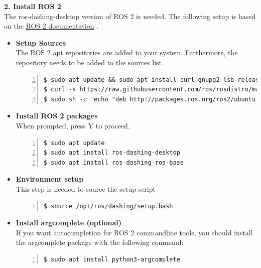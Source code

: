 \documentclass[plainarticle,zihtitle,english,final,hyperref,utf8]{zihpub}
\begin{document}
\textbf{2. Install ROS 2}\\
\newline
The ros-dashing-desktop version of ROS 2 is needed. The following setup is based on the \href{https://index.ros.org/doc/ros2/Installation/Dashing/Linux-Install-Debians/}{ROS 2 documentation} \cite{ros2docuros}.
\begin{itemize}
    \item \textbf{Setup Sources} \\
    The ROS 2 apt repositories are added to your system. Furthermore, the repository needs to be added to the sources list.
    \begin{Verbatim}[breaklines=true, breakanywhere=true, baselinestretch=1,fontsize=\scriptsize,numbers=left,frame=single,stepnumber=5,xleftmargin=1cm,xrightmargin=1cm]
$ sudo apt update && sudo apt install curl gnupg2 lsb-release
$ curl -s https://raw.githubusercontent.com/ros/rosdistro/master/ros.asc | sudo apt-key add -
$ sudo sh -c 'echo "deb http://packages.ros.org/ros2/ubuntu `lsb_release -cs` main" > /etc/apt/sources.list.d/ros2-latest.list'
    \end{Verbatim}
        
    \item \textbf{Install ROS 2 packages} \\
         When prompted, press Y to proceed.
         
    \begin{Verbatim}[breaklines=true, breakanywhere=true, baselinestretch=1,fontsize=\scriptsize,numbers=left,frame=single,stepnumber=5,xleftmargin=1cm,xrightmargin=1cm]
$ sudo apt update
$ sudo apt install ros-dashing-desktop
$ sudo apt install ros-dashing-ros-base
    \end{Verbatim}
        
    \item \textbf{Environment setup} \\
        This step is needed to source the setup script
        \begin{Verbatim}[breaklines=true, breakanywhere=true, baselinestretch=1,fontsize=\scriptsize,numbers=left,frame=single,stepnumber=5,xleftmargin=1cm,xrightmargin=1cm]
$ source /opt/ros/dashing/setup.bash
        \end{Verbatim}
        
    \item \textbf{Install argcomplete (optional)} \\
    If you want autocompletion for ROS 2 commandline tools, you should install the argcomplete package with the following command:
    \begin{Verbatim}[breaklines=true, breakanywhere=true, baselinestretch=1,fontsize=\scriptsize,numbers=left,frame=single,stepnumber=5,xleftmargin=1cm,xrightmargin=1cm]
$ sudo apt install python3-argcomplete
    \end{Verbatim}
\end{itemize}
\end{document}
